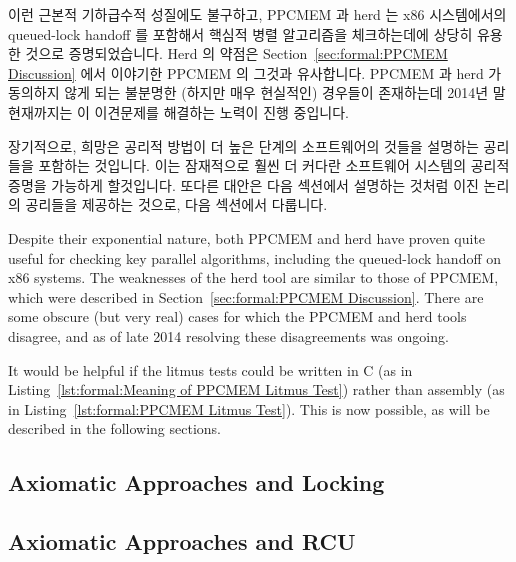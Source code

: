 이런 근본적 기하급수적 성질에도 불구하고, PPCMEM 과 herd 는 x86 시스템에서의
queued-lock handoff 를 포함해서 핵심적 병렬 알고리즘을 체크하는데에 상당히
유용한 것으로 증명되었습니다.
Herd 의 약점은
Section~\ref{sec:formal:PPCMEM Discussion} 에서 이야기한 PPCMEM 의 그것과
유사합니다.
PPCMEM 과 herd 가 동의하지 않게 되는 불분명한 (하지만 매우 현실적인) 경우들이
존재하는데 2014년 말 현재까지는 이 이견문제를 해결하는 노력이 진행 중입니다.

장기적으로, 희망은 공리적 방법이 더 높은 단계의 소프트웨어의 것들을 설명하는
공리들을 포함하는 것입니다.
이는 잠재적으로 훨씬 더 커다란 소프트웨어 시스템의 공리적 증명을 가능하게
할것입니다.
또다른 대안은 다음 섹션에서 설명하는 것처럼 이진 논리의 공리들을 제공하는
것으로, 다음 섹션에서 다룹니다.
\iffalse

Despite their exponential nature, both PPCMEM and herd have proven quite
useful for checking key parallel algorithms, including the queued-lock
handoff on x86 systems.
The weaknesses of the herd tool are similar to those of PPCMEM, which
were described in
Section~\ref{sec:formal:PPCMEM Discussion}.
There are some obscure (but very real) cases for which the PPCMEM and
herd tools disagree, and as of late 2014 resolving these disagreements
was ongoing.

It would be helpful if the litmus tests could be written in C
(as in Listing~\ref{lst:formal:Meaning of PPCMEM Litmus Test})
rather than assembly
(as in Listing~\ref{lst:formal:PPCMEM Litmus Test}).
This is now possible, as will be described in the following sections.

\subsection{Axiomatic Approaches and Locking}
\label{sec:formal:Axiomatic Approaches and Locking}

\subsection{Axiomatic Approaches and RCU}
\label{sec:formal:Axiomatic Approaches and RCU}

